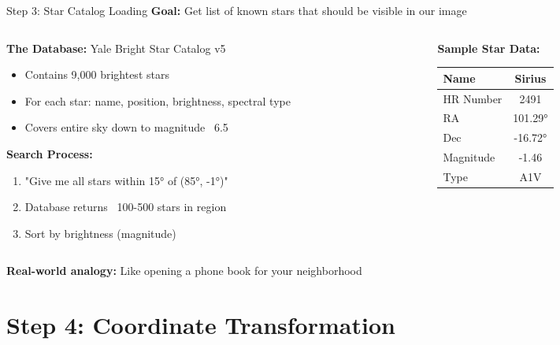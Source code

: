 \documentclass[aspectratio=169]{beamer}
\begin{document}
\begin{frame}{Step 3: Star Catalog Loading}
\textbf{Goal:} Get list of known stars that should be visible in our image

\begin{columns}
\begin{column}{0.6\textwidth}
\textbf{The Database:} Yale Bright Star Catalog v5
\begin{itemize}
\item Contains 9,000 brightest stars
\item For each star: name, position, brightness, spectral type
\item Covers entire sky down to magnitude ~6.5
\end{itemize}

\textbf{Search Process:}
\begin{enumerate}
\item "Give me all stars within 15° of (85°, -1°)"
\item Database returns ~100-500 stars in region
\item Sort by brightness (magnitude)
\end{enumerate}
\end{column}

\begin{column}{0.4\textwidth}
\begin{center}
\textbf{Sample Star Data:}
\\[0.3cm]
\begin{tabular}{|l|c|}
\hline
\textbf{Name} & \textbf{Sirius} \\
\hline
HR Number & 2491 \\
\hline
RA & 101.29° \\
\hline
Dec & -16.72° \\
\hline
Magnitude & -1.46 \\
\hline
Type & A1V \\
\hline
\end{tabular}
\end{center}
\end{column}
\end{columns}

\vspace{0.5cm}
\textbf{Real-world analogy:} \textcolor{starblue}{Like opening a phone book for your neighborhood}
\end{frame}

\section{Step 4: Coordinate Transformation}
\end{document}
